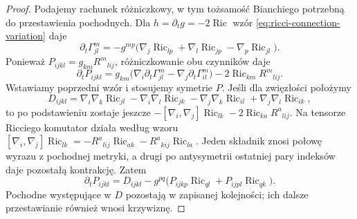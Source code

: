 \begin{proof}
Podajemy rachunek różniczkowy, w tym tożsamość
Bianchiego potrzebną do przestawienia pochodnych.
Dla $h=\partial_tg=-2\operatorname{Ric}$ wzór
\eqref{eq:ricci-connection-variation} daje
\[
 \partial_t\Gamma^m_{jl}
 =-g^{mp}\bigl(\nabla_j\operatorname{Ric}_{lp}
               +\nabla_l\operatorname{Ric}_{jp}
               -\nabla_p\operatorname{Ric}_{jl}\bigr).
\]
Ponieważ $P_{ijkl}=g_{km}R^m{}_{l i j}$,
różniczkowanie obu czynników daje
\[
 \partial_tP_{ijkl}
 =g_{km}\bigl(\nabla_i\partial_t\Gamma^m_{jl}
             -\nabla_j\partial_t\Gamma^m_{il}\bigr)
   -2\operatorname{Ric}_{km}R^m{}_{l i j}.
\]
Wstawiamy poprzedni wzór i stosujemy symetrie $P$.
Jeśli dla zwięzłości położymy
\[
 D_{ijkl}
  =\nabla_i\nabla_k\operatorname{Ric}_{jl}
   -\nabla_i\nabla_l\operatorname{Ric}_{jk}
   -\nabla_j\nabla_k\operatorname{Ric}_{il}
   +\nabla_j\nabla_l\operatorname{Ric}_{ik},
\]
to po podstawieniu zostaje jeszcze
$-[\nabla_i,\nabla_j]\operatorname{Ric}_{lk}
-2\operatorname{Ric}_{ka}R^a{}_{lij}$.
Na tensorze Ricciego komutator działa według wzoru
$[\nabla_i,\nabla_j]\operatorname{Ric}_{lk}
=-R^a{}_{lij}\operatorname{Ric}_{ak}
-R^a{}_{kij}\operatorname{Ric}_{la}$.
Jeden składnik znosi połowę wyrazu z pochodnej metryki,
a drugi po antysymetrii ostatniej pary indeksów daje
pozostałą kontrakcję. Zatem
\begin{equation}\label{eq:ricci-P-variation-intermediate}
 \partial_tP_{ijkl}
 =D_{ijkl}
  -g^{pq}\bigl(P_{ijkp}\operatorname{Ric}_{ql}
             +P_{ijpl}\operatorname{Ric}_{qk}\bigr).
\end{equation}
Pochodne występujące w $D$ pozostają w zapisanej kolejności;
ich dalsze przestawianie również wnosi krzywiznę.


\end{proof}
